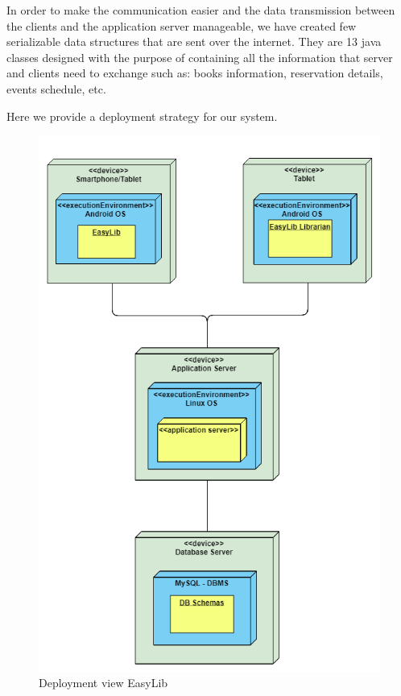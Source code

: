 In order to make the communication easier and the data transmission between the clients and the application server manageable, we have created few serializable data structures that are sent over the internet. They are 13 java classes designed with the purpose of containing all the information that server and clients need to exchange such as: books information, reservation details, events schedule, etc. 

Here we provide a deployment strategy for our system.

\vspace*{0cm}
\begin{figure}[H]
	\centering
	\includegraphics[scale=0.55]{Images/Diagrams/Deployment_view_EasyLib}
	\caption{Deployment view EasyLib}
\end{figure}


